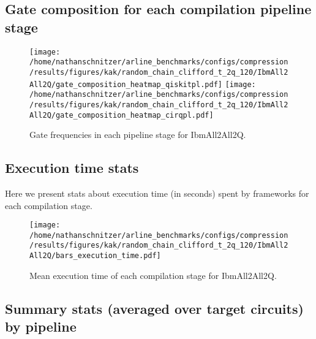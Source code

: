 \documentclass{report}%
\begin{document}
%
\clearpage%
\subsection*{Gate composition for each compilation pipeline stage}%
\label{subsec:Gatecompositionforeachcompilationpipelinestage}%

%


\begin{figure}[h!]%
\centering%
\texttt{[image: /home/nathanschnitzer/arline\_benchmarks/configs/compression/results/figures/kak/random\_chain\_clifford\_t\_2q\_120/IbmAll2All2Q/gate\_composition\_heatmap\_qiskitpl.pdf]}%
\centering%
\texttt{[image: /home/nathanschnitzer/arline\_benchmarks/configs/compression/results/figures/kak/random\_chain\_clifford\_t\_2q\_120/IbmAll2All2Q/gate\_composition\_heatmap\_cirqpl.pdf]}%
\linebreak%
\caption{Gate frequencies in each pipeline stage for IbmAll2All2Q.}%
\end{figure}

%
\subsection*{Execution time stats }%
\label{subsec:Executiontimestats}%

%
Here we present stats about execution time (in seconds)
                spent by frameworks for each compilation stage.%


\begin{figure}[h!]%
\centering%
\texttt{[image: /home/nathanschnitzer/arline\_benchmarks/configs/compression/results/figures/kak/random\_chain\_clifford\_t\_2q\_120/IbmAll2All2Q/bars\_execution\_time.pdf]}%
\caption{Mean execution time of each compilation stage for IbmAll2All2Q.}%
\end{figure}

%
\subsection*{Summary stats (averaged over target circuits) by pipeline}%
\label{subsec:Summarystats(averagedovertargetcircuits)bypipeline}%
\end{document}
